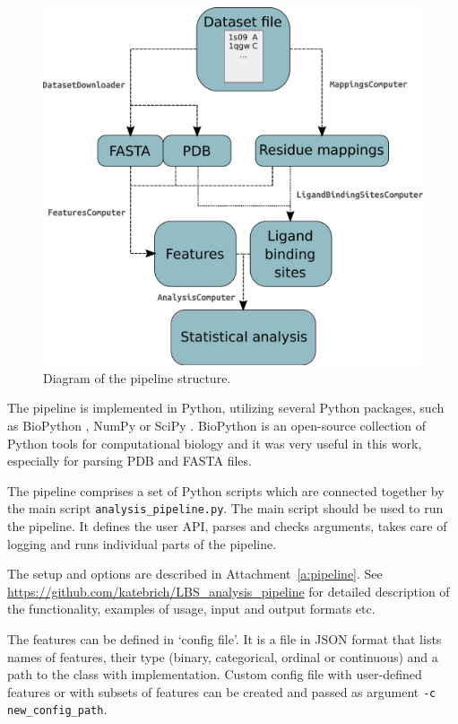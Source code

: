 \begin{figure}[!h]\centering
\includegraphics[width=140mm]{../img/pipelineDiagram.pdf}
\caption{Diagram of the pipeline structure.}
\label{fig:diagram}
\end{figure}

The pipeline is implemented in Python, utilizing several Python packages, such as BioPython \cite{biopython}, NumPy \cite{numpy} or SciPy \cite{scipy}. BioPython is an open-source collection of Python tools for computational biology and it was very useful in this work, especially for parsing PDB and FASTA files.

The pipeline comprises a set of Python scripts which are connected together by the main script \texttt{analysis\_pipeline.py}. The main script should be used to run the pipeline. It defines the user API, parses and checks arguments, takes care of logging and runs individual parts of the pipeline. 


The setup and options are described in Attachment~\ref{a:pipeline}. See \url{https://github.com/katebrich/LBS_analysis_pipeline} for detailed description of the functionality, examples of usage, input and output formats etc.

The features can be defined in `config file'. It is a file in JSON format that lists names of features, their type (binary, categorical, ordinal or continuous) and a path to the class with implementation. Custom config file with user-defined features or with subsets of features can be created and passed as argument \texttt{-c new\_config\_path}.

